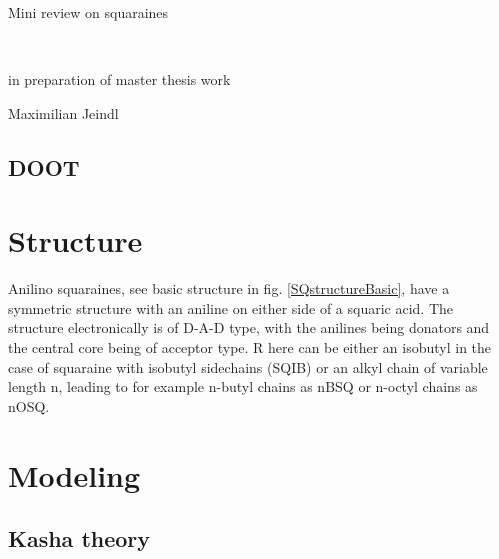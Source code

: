 \documentclass{article}
\begin{document}
\begin{center}
\begin{Large}

Mini review on squaraines
\end{Large}\\
\begin{large}
in preparation of master thesis work\\
\end{large}
\normalsize Maximilian Jeindl\\
\end{center}

\subsection{DOOT}

\begin{multicols}{2}
\section{Structure}
Anilino squaraines, see basic structure in fig. \ref{SQstructureBasic}, have a symmetric structure with an aniline on either side of a squaric acid. The structure electronically is of D-A-D type, with the anilines being donators and the central core being of acceptor type. R here can be either an isobutyl in the case of squaraine with isobutyl sidechains (SQIB) or an alkyl chain of variable length n, leading to for example n-butyl chains as nBSQ or n-octyl chains as nOSQ. \cite{Balzer2022}

\section{Modeling}
\subsection{Kasha theory}


\end{multicols}
\end{document}
